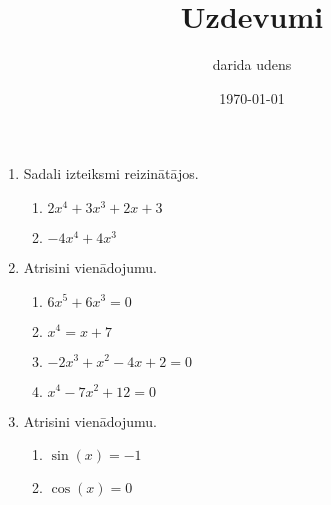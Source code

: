 \documentclass[12pt]{article}
\author{darida udens}
\date{\today}
\title{Uzdevumi}
\begin{document}
    \maketitle
    \begin{enumerate}
        \item Sadali izteiksmi reizinātājos.
    \begin{enumerate}
        \item $2 x^{4} + 3 x^{3} + 2 x + 3$
        \item $- 4 x^{4} + 4 x^{3}$
    \end{enumerate}
        \item Atrisini vienādojumu.
    \begin{enumerate}
        \item $6 x^{5} + 6 x^{3} = 0$
        \item $x^{4} = x + 7$
        \item $- 2 x^{3} + x^{2} - 4 x + 2 = 0$
        \item $x^{4} - 7 x^{2} + 12 = 0$
    \end{enumerate}
        \item Atrisini vienādojumu.
    \begin{enumerate}
        \item $\sin{\left(x \right)} = -1$
        \item $\cos{\left(x \right)} = 0$
    \end{enumerate}

	\end{enumerate}
\end{document}
